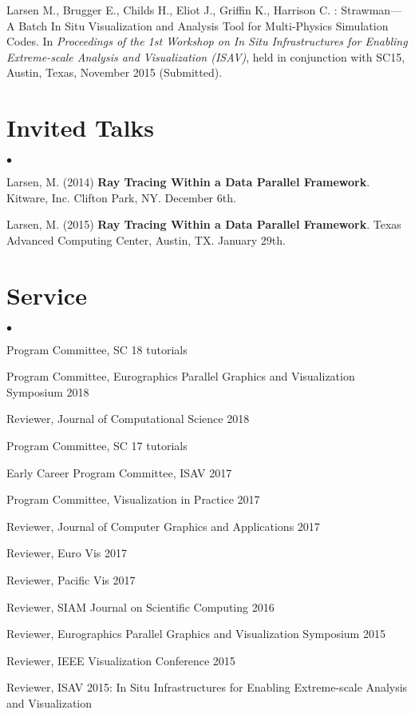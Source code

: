 \documentclass[margin,line]{res}
\newenvironment{list2}{
  \begin{list}{$\bullet$}{%
      \setlength{\itemsep}{0in}
      \setlength{\parsep}{0in} \setlength{\parskip}{0in}
      \setlength{\topsep}{0in} \setlength{\partopsep}{0in} 
      \setlength{\leftmargin}{0.2in}}}{\end{list}}
\begin{document}
\begin{resume}
Larsen M., Brugger E., Childs H., Eliot J., Griffin K., Harrison C. : Strawman---A Batch In Situ Visualization and Analysis Tool for Multi-Physics Simulation Codes. In \textit{Proceedings of the 1st Workshop on In Situ Infrastructures for Enabling Extreme-scale Analysis and Visualization (ISAV)}, held in conjunction with SC15, Austin, Texas, November 2015 (Submitted).

\section{\sc Invited Talks}
\begin{list2}
	\item Larsen, M. (2014) \textbf{Ray Tracing Within a Data Parallel Framework}. Kitware, Inc. Clifton Park, NY. December 6th. 
	\item Larsen, M. (2015) \textbf{Ray Tracing Within a Data Parallel Framework}. Texas Advanced Computing Center, Austin, TX. January 29th.
\end{list2}

\section{\sc Service}
\begin{list2}
	\item Program Committee, SC 18 tutorials
	\item Program Committee, Eurographics Parallel Graphics and Visualization Symposium 2018
	\item Reviewer, Journal of Computational Science 2018
    \item Program Committee, SC 17 tutorials
    \item Early Career Program Committee, ISAV 2017
    \item Program Committee, Visualization in Practice 2017
    \item Reviewer, Journal of Computer Graphics and Applications 2017
    \item Reviewer, Euro Vis 2017
    \item Reviewer, Pacific Vis 2017
    \item Reviewer, SIAM Journal on Scientific Computing 2016
	\item Reviewer, Eurographics Parallel Graphics and Visualization Symposium 2015 
	\item Reviewer, IEEE Visualization Conference 2015
	\item Reviewer, ISAV 2015: In Situ Infrastructures for Enabling Extreme-scale Analysis and Visualization 
\end{list2}


\end{resume}
\end{document}
